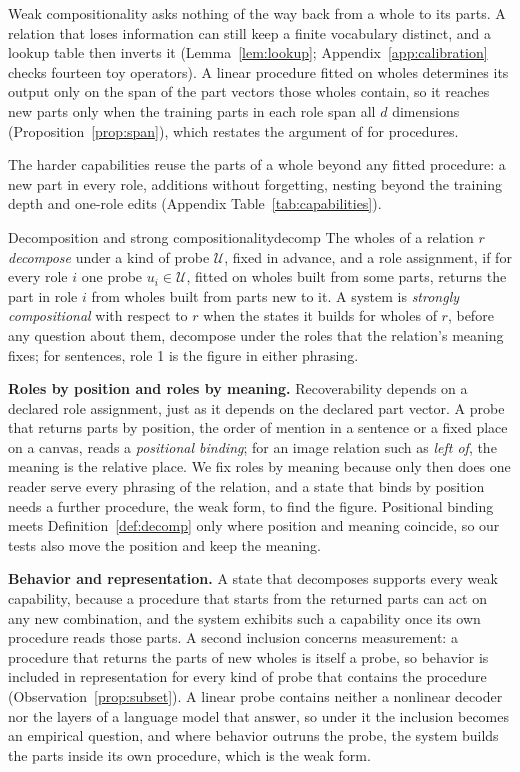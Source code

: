 \documentclass{article}
\theoremstyle{plain}
\theoremstyle{remark}
\newcommand{\U}{\mathcal{U}}
\begin{document}
Weak compositionality asks nothing of the way back from a whole to its parts. A relation that loses information can still keep a finite vocabulary distinct, and a lookup table then inverts it (Lemma~\ref{lem:lookup}; Appendix~\ref{app:calibration} checks fourteen toy operators). A linear procedure fitted on wholes determines its output only on the span of the part vectors those wholes contain, so it reaches new parts only when the training parts in each role span all $d$ dimensions (Proposition~\ref{prop:span}), which restates the argument of \citet{marcus1998} for procedures.

The harder capabilities reuse the parts of a whole beyond any fitted procedure: a new part in every role, additions without forgetting, nesting beyond the training depth and one-role edits (Appendix Table~\ref{tab:capabilities}).

\begin{defbox}{Decomposition and strong compositionality}{decomp}
The wholes of a relation $r$ \emph{decompose} under a kind of probe $\U$, fixed in advance, and a role assignment, if for every role $i$ one probe $u_i \in \U$, fitted on wholes built from some parts, returns the part in role $i$ from wholes built from parts new to it. A system is \emph{strongly compositional} with respect to $r$ when the states it builds for wholes of $r$, before any question about them, decompose under the roles that the relation's meaning fixes; for sentences, role 1 is the figure in either phrasing.
\end{defbox}

\textbf{Roles by position and roles by meaning.} Recoverability depends on a declared role assignment, just as it depends on the declared part vector. A probe that returns parts by position, the order of mention in a sentence or a fixed place on a canvas, reads a \emph{positional binding}; for an image relation such as \emph{left of}, the meaning is the relative place. We fix roles by meaning because only then does one reader serve every phrasing of the relation, and a state that binds by position needs a further procedure, the weak form, to find the figure. Positional binding meets Definition~\ref{def:decomp} only where position and meaning coincide, so our tests also move the position and keep the meaning.

\textbf{Behavior and representation.} A state that decomposes supports every weak capability, because a procedure that starts from the returned parts can act on any new combination, and the system exhibits such a capability once its own procedure reads those parts. A second inclusion concerns measurement: a procedure that returns the parts of new wholes is itself a probe, so behavior is included in representation for every kind of probe that contains the procedure (Observation~\ref{prop:subset}). A linear probe contains neither a nonlinear decoder nor the layers of a language model that answer, so under it the inclusion becomes an empirical question, and where behavior outruns the probe, the system builds the parts inside its own procedure, which is the weak form.
\end{document}
